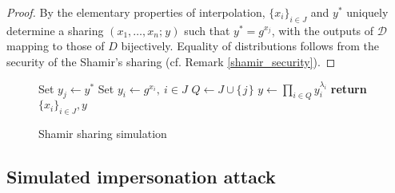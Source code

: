 \documentclass[psamsfonts, reqno]{amsart}
\theoremstyle{definition}
\theoremstyle{remark}
\numberwithin{equation}{section}
\begin{document}
\begin{proof}
By the elementary properties of interpolation,
$\{x_i\}_{i \in J}$ and $y^*$ uniquely determine a sharing
$(x_1, \dots, x_n;\hspace{1pt} y)$ such that $y^* = g ^ {x_j}$,
with the outputs of $\mathcal{D}$
mapping to those of $D$ bijectively.
Equality of distributions follows
from the security of the Shamir's sharing
(cf. Remark \ref{shamir_security}).
\end{proof}

\begin{figure}[H]
\begin{minipage}{0.42\textwidth}
\begin{algorithm}[H]
    \centering
    \caption{$\mathcal{D}\hspace{1pt}(\hspace{1pt}y^*, j\hspace{1pt}, \{x_i\}_{i \in J})$}
    \begin{algorithmic}[1]
    	\vspace{4pt}
    	\State
    		Set $y_j \leftarrow y^*$\vspace{6pt}
		\State
    		Set $y_i \leftarrow g ^ {x_i},\ i \in J$\vspace{6pt}
    	\State
    		$Q \leftarrow J \cup \{\hspace{1pt}j\hspace{1pt}\}$\vspace{6pt}
    	\State
    		$y \leftarrow \prod_{i \in Q} y_i ^ {\lambda_i}$\vspace{6pt}
		\State
			\textbf{return $\{x_i\}_{i \in J}, y$}\vspace{5pt}
    \end{algorithmic}
\end{algorithm}
\vspace{0pt}
\end{minipage}
\vspace{-12pt}
\caption{Shamir sharing simulation}
\label{fig_shamir_sharing_simulation}
\end{figure}

\subsection{Simulated impersonation attack}\label{section_simulated_impersonation_attack}
\end{document}
